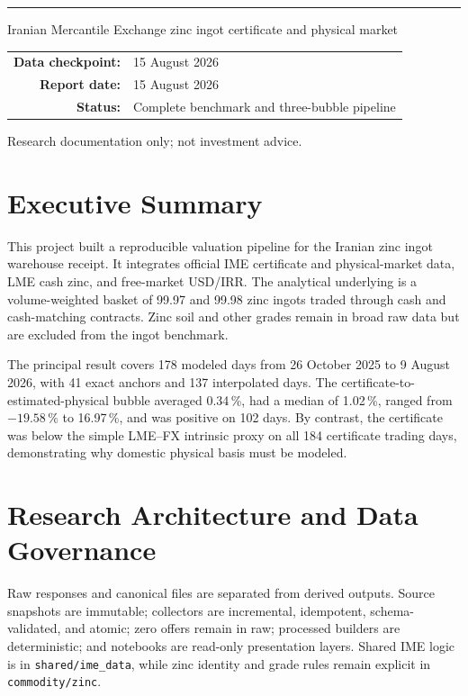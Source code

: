 \documentclass[11pt,a4paper]{article}
\newcommand{\pct}{\,\%}\newcommand{\code}[1]{\texttt{#1}}
\begin{document}
\begin{titlepage}\centering
{}
\vspace{0.5cm}{\LARGE Data, Methodology, Implementation, and Results\par}
\vspace{1cm}\rule{0.85\textwidth}{1pt}\par\vfill
{\large Iranian Mercantile Exchange zinc ingot certificate and physical market\par}
\vspace{0.3cm}{\large LME cash zinc and free-market USD/IRR\par}\vfill
\begin{tabular}{rl}\textbf{Data checkpoint:}&15 August 2026\\\textbf{Report date:}&15 August 2026\\\textbf{Status:}&Complete benchmark and three-bubble pipeline\end{tabular}
\vfill{\small Research documentation only; not investment advice.\par}
\end{titlepage}
\tableofcontents\newpage

\section{Executive Summary}
This project built a reproducible valuation pipeline for the Iranian zinc ingot warehouse
receipt. It integrates official IME certificate and physical-market data, LME cash zinc, and
free-market USD/IRR. The analytical underlying is a volume-weighted basket of 99.97 and 99.98
zinc ingots traded through cash and cash-matching contracts. Zinc soil and other grades remain
in broad raw data but are excluded from the ingot benchmark.

The principal result covers 178 modeled days from 26 October 2025 to 9 August 2026, with 41
exact anchors and 137 interpolated days. The certificate-to-estimated-physical bubble averaged
0.34\pct, had a median of 1.02\pct, ranged from $-19.58\pct$ to 16.97\pct, and was positive
on 102 days. By contrast, the certificate was below the simple LME--FX intrinsic proxy on all
184 certificate trading days, demonstrating why domestic physical basis must be modeled.

\section{Research Architecture and Data Governance}
Raw responses and canonical files are separated from derived outputs. Source snapshots are
immutable; collectors are incremental, idempotent, schema-validated, and atomic; zero offers
remain in raw; processed builders are deterministic; and notebooks are read-only presentation
layers. Shared IME logic is in \code{shared/ime\_data}, while zinc identity and grade rules remain
explicit in \code{commodity/zinc}.
\end{document}
